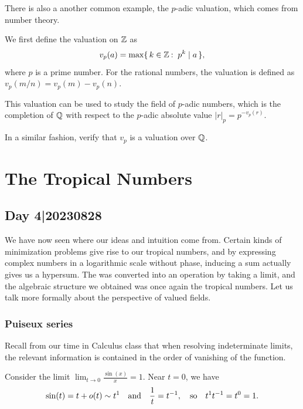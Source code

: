 \documentclass[12pt]{memoir}
\theoremstyle{definition}
\begin{document}
There is also a another common example, the $p$-adic valuation, which comes from number theory.\par
We first define the valuation on $\mathbb{Z}$ as 
$$v_p(a)=\max\set{k\in\bZ\:\ p^k\mid a},$$
 where $p$ is a prime number. For the rational numbers, the valuation is defined as $v_p(m/n)=v_p(m)-v_p(n)$.\par
This valuation can be used to study the field of $p$-adic numbers, which is the completion of $\mathbb{Q}$ with respect to the $p$-adic absolute value $|r|_p=p^{-v_p(r)}$.

\begin{Ej}
In a similar fashion, verify that $v_p$ is a valuation over $\mathbb{Q}$.
\end{Ej}

\chapter{The Tropical Numbers}

\section{Day 4|20230828}

We have now seen where our ideas and intuition come from. Certain kinds of minimization problems give rise to our tropical numbers, and by expressing complex numbers in a logarithmic scale without phase, inducing a sum actually gives us a hypersum. The was converted into an operation by taking a limit, and the algebraic structure we obtained was once again the tropical numbers. Let us talk more formally about the perspective of valued fields.

\subsection{Puiseux series}
Recall from our time in Calculus class that when resolving indeterminate limits, the relevant information is contained in the order of vanishing of the function.

\begin{Ex}
    Consider the limit $\lim_{t\to 0}\frac{\sin(x)}{x}=1$. Near $t=0$, we have 
    $$\sin(t)=t+o(t)\sim t^1\quad\text{and}\quad\frac{1}{t}=t^{-1},\quad\text{so}\quad t^1t^{-1}=t^0=1.$$
\end{Ex}
\end{document}
